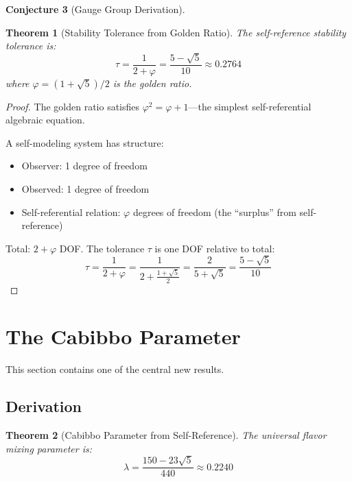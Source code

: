 \documentclass[11pt,a4paper]{article}
\theoremstyle{plain}
\newtheorem{theorem}{Theorem}[section]
\theoremstyle{definition}
\newtheorem{conjecture}[theorem]{Conjecture}
\theoremstyle{remark}
\begin{document}
\begin{conjecture}[Gauge Group Derivation]
\begin{theorem}[Stability Tolerance from Golden Ratio]
The self-reference stability tolerance is:
\begin{equation}
\boxed{\tau = \frac{1}{2+\varphi} = \frac{5-\sqrt{5}}{10} \approx 0.2764}
\end{equation}
where $\varphi = (1+\sqrt{5})/2$ is the golden ratio.
\end{theorem}

\begin{proof}
The golden ratio satisfies $\varphi^2 = \varphi + 1$---the simplest self-referential algebraic equation.

A self-modeling system has structure:
\begin{itemize}[noitemsep]
    \item Observer: 1 degree of freedom
    \item Observed: 1 degree of freedom
    \item Self-referential relation: $\varphi$ degrees of freedom (the ``surplus'' from self-reference)
\end{itemize}
Total: $2 + \varphi$ DOF. The tolerance $\tau$ is one DOF relative to total:
\begin{equation}
\tau = \frac{1}{2+\varphi} = \frac{1}{2 + \frac{1+\sqrt{5}}{2}} = \frac{2}{5+\sqrt{5}} = \frac{5-\sqrt{5}}{10}
\end{equation}
\end{proof}

\section{The Cabibbo Parameter}

This section contains one of the central new results.

\subsection{Derivation}

\begin{theorem}[Cabibbo Parameter from Self-Reference]
The universal flavor mixing parameter is:
\begin{equation}
\boxed{\lambda = \frac{150 - 23\sqrt{5}}{440} \approx 0.2240}
\end{equation}
\end{theorem}


\end{conjecture}
\end{document}
